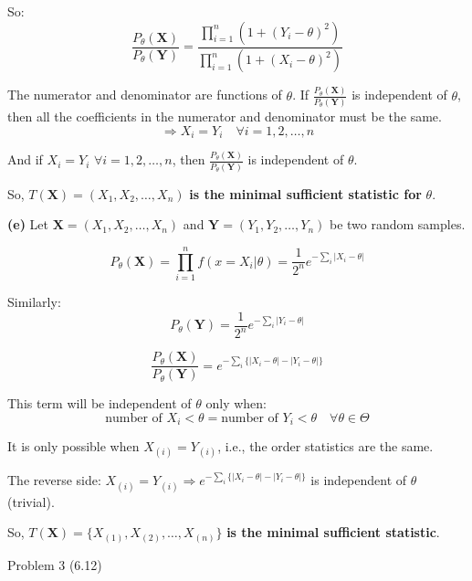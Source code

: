 \documentclass[12pt,a4paper,onecolumn]{exam}
\newcommand{\questionheader}[1]{%
  \begin{tcolorbox}[
    enhanced,
    colback=black,
    coltext=white,
    boxrule=0pt,
    fontupper=\Large\bfseries,
    arc=4mm
  ]
  #1
  \end{tcolorbox}%
}
\begin{document}
\begin{solution}
So:
\[
\frac{P_{\theta}(\mathbf{X})}{P_{\theta}(\mathbf{Y})} = \frac{\prod_{i=1}^{n}(1 + (Y_i - \theta)^2)}{\prod_{i=1}^{n}(1 + (X_i - \theta)^2)}
\]

The numerator and denominator are functions of $\theta$. If $\frac{P_{\theta}(\mathbf{X})}{P_{\theta}(\mathbf{Y})}$ is independent of $\theta$, then all the coefficients in the numerator and denominator must be the same.
\[
\Rightarrow X_i = Y_i \quad \forall i = 1, 2, \ldots, n
\]

And if $X_i = Y_i$ $\forall i = 1, 2, \ldots, n$, then $\frac{P_{\theta}(\mathbf{X})}{P_{\theta}(\mathbf{Y})}$ is independent of $\theta$.

So, $\boxed{T(\mathbf{X}) = (X_1, X_2, \ldots, X_n)}$ \textbf{is the minimal sufficient statistic for} $\theta$.

\vspace{1em}
\textbf{(e)} Let $\mathbf{X} = (X_1, X_2, \ldots, X_n)$ and $\mathbf{Y} = (Y_1, Y_2, \ldots, Y_n)$ be two random samples.

\[
P_{\theta}(\mathbf{X}) = \prod_{i=1}^{n} f(x = X_i | \theta) = \frac{1}{2^n} e^{-\sum_i |X_i - \theta|}
\]

Similarly:
\[
P_{\theta}(\mathbf{Y}) = \frac{1}{2^n} e^{-\sum_i |Y_i - \theta|}
\]

\[
\frac{P_{\theta}(\mathbf{X})}{P_{\theta}(\mathbf{Y})} = e^{-\sum_i \{|X_i - \theta| - |Y_i - \theta|\}}
\]

This term will be independent of $\theta$ only when:
\[
\text{number of } X_i < \theta = \text{number of } Y_i < \theta \quad \forall \theta \in \Theta
\]

It is only possible when $X_{(i)} = Y_{(i)}$, i.e., the order statistics are the same.

The reverse side: $X_{(i)} = Y_{(i)} \Rightarrow e^{-\sum_i \{|X_i - \theta| - |Y_i - \theta|\}}$ is independent of $\theta$ (trivial).

So, $\boxed{T(\mathbf{X}) = \{X_{(1)}, X_{(2)}, \ldots, X_{(n)}\}}$ \textbf{is the minimal sufficient statistic}.
\end{solution}

\questionheader{Problem 3 (6.12)}
\end{document}

